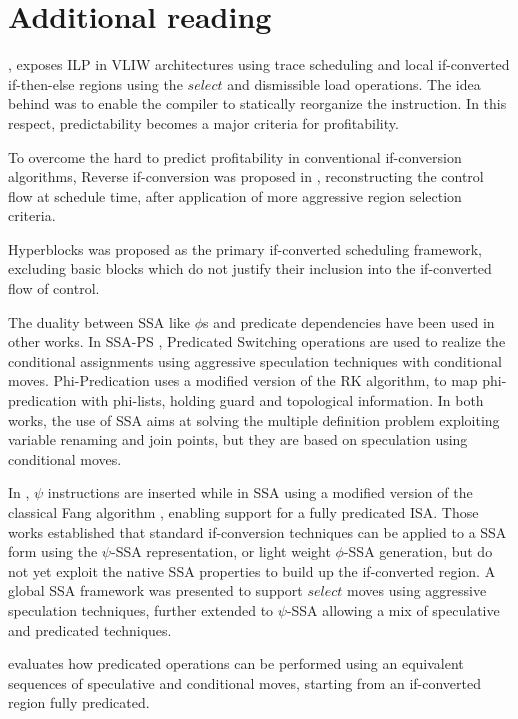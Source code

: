 \section{Additional reading}

\cite{Rau:2003:IP:1074100.1074489}, exposes ILP in VLIW architectures using trace scheduling and local if-converted if-then-else regions using the $select$ and dismissible load operations. The idea behind was to enable the compiler to statically reorganize the instruction. In this respect, predictability \cite{Fisher:1992:PCB:143371.143493} becomes a major criteria for profitability.

To overcome the hard to predict profitability in conventional if-conversion algorithms, Reverse if-conversion was proposed in \cite{August:1999:PRI:326224.325595}, reconstructing the control flow at schedule time, after application of more aggressive region selection criteria.

Hyperblocks \cite{Mahlke:1992:ECS:144965.144998} was proposed as the primary if-converted scheduling framework, excluding basic blocks which do not justify their inclusion into the if-converted flow of control.

The duality between SSA like $\phi$s and predicate dependencies have been used in other works. In SSA-PS \cite{Jacome01clusteredvliw}, Predicated Switching operations are used to realize the conditional assignments using aggressive speculation techniques with conditional moves. Phi-Predication \cite{Chuang03phi-predicationfor} uses a modified version of the RK algorithm, to map phi-predication with phi-lists, holding guard and topological information. In both works, the use of SSA aims at solving the multiple definition problem exploiting variable renaming and join points, but they are based on speculation using conditional moves. 

In \cite{Stoutchinin_Gao_2004}, $\psi$ instructions are inserted while in SSA using a modified version of the classical Fang algorithm \cite{Fang:1996:CAI:645674.663446}, enabling support for a fully predicated ISA.
Those works established that standard if-conversion techniques can be applied to a SSA form using the $\psi$-SSA representation, or light weight $\phi$-SSA generation, but do not yet exploit the native SSA properties to build up the if-converted region.
A global SSA framework was presented \cite{odes_bruel} to support $select$ moves using aggressive speculation techniques, further extended to $\psi$-SSA \cite{ijes_bruel} allowing a mix of speculative and predicated techniques.

\cite{Mahlke95acomparison} evaluates how predicated operations can be performed using an equivalent sequences of speculative and conditional moves, starting from an if-converted region fully predicated. 










